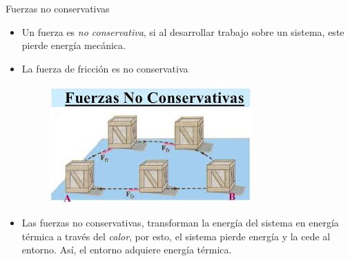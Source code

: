     \begin{frame}{Fuerzas no conservativas}
        
        \begin{itemize}
            \pause \item Un fuerza es \textit{no conservativa}, si al desarrollar trabajo sobre un sistema, este pierde energía mecánica.
            
            \pause \item La fuerza de fricción es no conservativa
            
        \begin{figure}
            \centering
            \includegraphics[scale=0.7]{figures/FNOC.jpeg}
        \end{figure}
        
        \pause \item Las fuerzas no conservativas, transforman la energía del sistema en energía térmica a través del \textit{calor}, por esto, el sistema pierde energía y la cede al entorno. Así, el entorno adquiere energía térmica. 
        
        \end{itemize}
        
    \end{frame}
    
    
